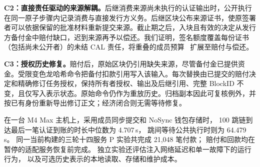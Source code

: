 \noindent\textbf{C2：直接责任驱动的来源解耦。}后继消费来源尚未执行的认证输出时，公开执行在同一原子步骤内记录消费与直接发行方义务。后继区块公布来源证书，使原签署者可以依据保留的批准材料重新提交来源。截止期之后，入块且有效的决定从发行方备付金中赔付缺口，迟到来源再予以偿还。我们证明，签名额度覆盖每份证书（包括尚未公开者）的未结 CAL 责任，将重叠的成员预算~\cite{stingray} 扩展至赔付与偿还。

\noindent\textbf{C3：授权历史修复。}赔付后，原始区块仍引用缺失来源，尽管备付金已提供资金。受限变色龙哈希命令把备付扣款引用写入该输入。每次替换由已提交的赔付决定和精确修订任务授权，保持所有者授权、输出及后继引用、完整 BlockID 不变，且仅写入表示状态。原始命令仍作为重放历史。归档副本因此可复核例外，并按已有身份重新导出修订正文；经济闭合则无需等待修复。

在一台 M4 Max 主机上，采用成员同步提交和 NoSync 钱包存储时，
100 跳链到达最后一笔认证到账的时长中位数为 4.707\,s，
跳间等待公共执行时则为 64.479\,s。
同一当前构建的三轮十四服务 P 实验共完成 21,048 笔付款；
赔付和回款均在暂停的适配服务恢复前完成。
独立实验还评估注入网络延迟和单一故障下的运行行为，
以及可选历史表示的本地读取、存储和维护成本。
